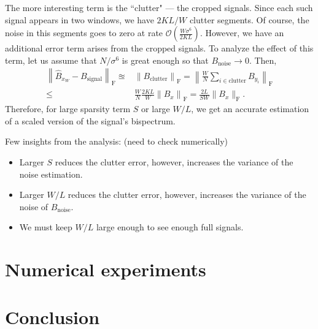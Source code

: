 \documentclass[journal]{IEEEtran}
\numberwithin{equation}{section}
\numberwithin{figure}{section}
\theoremstyle{plain}
\theoremstyle{definition}
\theoremstyle{remark}
\theoremstyle{plain}
\theoremstyle{remark}
\theoremstyle{plain}
\theoremstyle{plain}
\newcommand{\order}[1]{\mathcal{O}\left({#1} \right)}
\begin{document}
The more interesting term is the ``clutter" --- the cropped signals. Since each such signal appears in two windows,
we have $2KL/W$ clutter segments. Of course, the noise in this segments goes to zero
at rate $\order{\frac{W\sigma^6}{2KL}}$. However, we have an additional error term arises from  the cropped signals. To analyze the effect of this term, let us assume that $N/\sigma^6$ is great enough so that $B_\textrm{noise}\to 0$. Then,
\begin{equation}
\begin{split}
\left\| \hat{B}_{x_W} - B_\textrm{signal}\right\|_{\textrm{F}} \approxeq&  \left\|B_\textrm{clutter}\right\|_{\textrm{F}}
= \left\|\frac{W}{N}\sum_{i\in\textrm{clutter}}B_{y_i}\right\|_{\textrm{F}}
\\ \leq & 
\frac{W}{N}\frac{2KL}{W}\left\|B_x\right\|_{\textrm{F}} = \frac{2L}{SW}
\|B_x\|_{\textrm{F}}.
\end{split}
\end{equation}
Therefore, for large sparsity term $S$ or large $W/L$, we get an accurate estimation of a scaled version of the signal's bispectrum. 


Few insights from the analysis: (need to check numerically)
\begin{itemize}
	\item Larger $S$ reduces the clutter error, however, increases the variance of the noise estimation.
	\item Larger $W/L$ reduces the clutter error, however, increases the variance of the noise  of $B_\textrm{noise}$.
	\item We must keep $W/L$ large enough to see enough full signals.    
\end{itemize} 


\section{Numerical experiments} \label{sec:experiments}

\section{Conclusion} \label{sec:conclusion}






\end{document}
